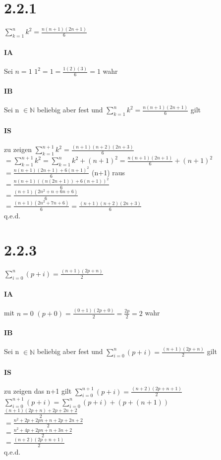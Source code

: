 \documentclass{article}
\begin{document}
\section*{2.2.1}
$\sum\limits_{k=1}^n k^2 = \frac{n(n+1)(2n+1)}{6}$
\paragraph{IA}
Sei $n=1$ $1^2 = 1 = \frac{1(2)(3)}{6}=1$ wahr
\paragraph{IB}
Sei n $\in \mathbb{N}$ beliebig aber fest und $\sum\limits_{k=1}^n k^2 = \frac{n(n+1)(2n+1)}{6}$ gilt
\paragraph{IS}
zu zeigen $\sum\limits_{k=1}^{n+1} k^2 = \frac{(n+1)(n+2)(2n+3)}{6}$ \\
$= \sum\limits_{k=1}^{n+1} k^2 = \sum\limits_{k=1}^{n} k^2 + (n+1)^2 = \frac{n(n+1)(2n+1)}{6}+(n+1)^2$ \\
$= \frac{n(n+1)(2n+1)+6(n+1)^2}{6} $ \textbar (n+1) raus \\
$= \frac{n(n+1)((n(2n+1))+6(n+1))^2}{6} $ \\
$= \frac{(n+1)(2n^2+n+6n+6)}{6} $ \\
$= \frac{(n+1)(2n^2+7n+6)}{6} = \frac{(n+1)(n+2)(2n+3)}{6} $ \\
q.e.d.

\section*{2.2.3}
$\sum\limits_{i=0}^n (p+i) = \frac{(n+1)(2p+n)}{2}$
\paragraph{IA}
mit $ n = 0$ $(p+0) = \frac{(0+1)(2p+0)}{2} =  \frac{2p}{2}=2$ wahr
\paragraph{IB}
Sei n $\in \mathbb{N}$ beliebig aber fest und $\sum\limits_{i=0}^n (p+i) = \frac{(n+1)(2p+n)}{2}$ gilt
\paragraph{IS}
zu zeigen das n+1 gilt $\sum\limits_{i=0}^{n+1} (p+i) = \frac{(n+2)(2p+n+1)}{2}$ \\
$\sum\limits_{i=0}^{n+1} (p+i) = \sum\limits_{i=0}^{n} (p+i)+(p+(n+1))$\\
$\frac{(n+1)(2p+n)+2p+2n+2}{2}$\\
$= \frac{n^2+2p+2pn+n+2p+2n+2}{2}$\\
$= \frac{n^2+4p+2pn+n+3n+2}{2}$\\
$= \frac{(n+2)(2p+n+1)}{2}$\\
q.e.d.
\end{document}
